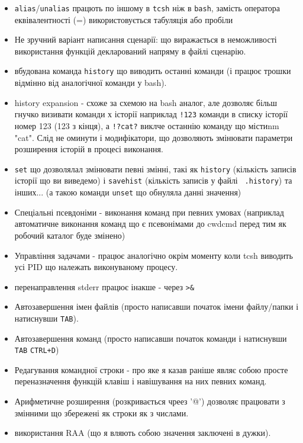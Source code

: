   \begin{itemize}
    \item \texttt{alias}/\texttt{unalias} працють по іншому в \texttt{tcsh} ніж в \texttt{bash}, замість оператора еквівалентності (=) використовується табуляція або пробіли
    \item Не зручний варіант написання сценарії: що виражається в неможливості використання функцій декларований напряму в файлі сценарію.
    \item вбудована команда \texttt{history} що виводить останні команди (і працює трошки відмінно від аналогічної команди у bash).
    \item history expansion - схоже за схемою на bash аналог, але дозволяє більш гнучко визивати команди х історії наприклад \texttt{!123} команди в списку історії номер 123 (123 з кінця), а \texttt{!?cat?} виклче останнію команду що містиnm "cat". Слід не оминути і модифікатори, що дозволяють змінювати параметри розширення історій в процесі виконання.
    \item \texttt{set} що дозволялал змінювати певні змінні, такі як \texttt{history} (кількість записів історії що ви виведемо) і \texttt{savehist} (кількість записів у файлі \texttt{~.history}) та інших... (а такою команди \texttt{unset} що обнуляла данні значення)
    \item Спеціальні псевдоніми - виконання команд при певних умовах (наприклад автоматичне виконання команд що є псевонімами до cwdcmd перед тим як робочий каталог буде змінено)
    \item Управління задачами - працює аналогічно окрім моменту коли tcsh виводить усі PID що належать виконуваному процесу.
    \item перенаправлення stderr працює інакше - через \texttt{>\&}
    \item Автозавершення імен файлів (просто написавши початок імени файлу/папки і натиснувши \texttt{TAB}).
    \item Автозавершення команд (просто написавши початок команди і натиснувши \texttt{TAB} \texttt{CTRL+D})
    \item Редагування командної строки - про яке я казав раніше являє собою просте переназначення функцій клавіш і навішування на них певних команд.
    \item Арифметичне розширення (розкривається чреез '@') дозволяє працювати з змінними що збережені як строки як з числами.
    \item використання RAA (що я вляють собою значення заключені в дужки).
    \end{itemize}

